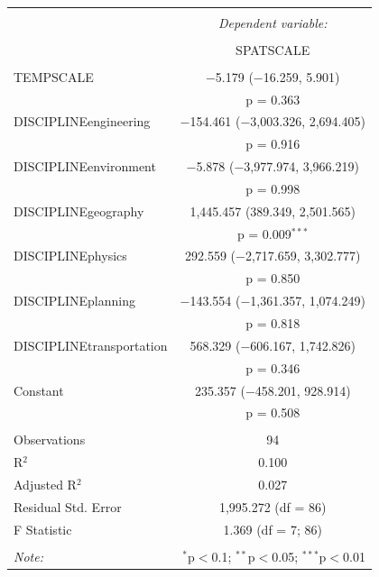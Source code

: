 \begin{table}[!htbp] \centering 
  \caption{} 
  \label{} 
\begin{tabular}{@{\extracolsep{5pt}}lc} 
\\[-1.8ex]\hline 
\hline \\[-1.8ex] 
 & \multicolumn{1}{c}{\textit{Dependent variable:}} \\ 
\cline{2-2} 
\\[-1.8ex] & SPATSCALE \\ 
\hline \\[-1.8ex] 
 TEMPSCALE & $-$5.179 ($-$16.259, 5.901) \\ 
  & p = 0.363 \\ 
  DISCIPLINEengineering & $-$154.461 ($-$3,003.326, 2,694.405) \\ 
  & p = 0.916 \\ 
  DISCIPLINEenvironment & $-$5.878 ($-$3,977.974, 3,966.219) \\ 
  & p = 0.998 \\ 
  DISCIPLINEgeography & 1,445.457 (389.349, 2,501.565) \\ 
  & p = 0.009$^{***}$ \\ 
  DISCIPLINEphysics & 292.559 ($-$2,717.659, 3,302.777) \\ 
  & p = 0.850 \\ 
  DISCIPLINEplanning & $-$143.554 ($-$1,361.357, 1,074.249) \\ 
  & p = 0.818 \\ 
  DISCIPLINEtransportation & 568.329 ($-$606.167, 1,742.826) \\ 
  & p = 0.346 \\ 
  Constant & 235.357 ($-$458.201, 928.914) \\ 
  & p = 0.508 \\ 
 \hline \\[-1.8ex] 
Observations & 94 \\ 
R$^{2}$ & 0.100 \\ 
Adjusted R$^{2}$ & 0.027 \\ 
Residual Std. Error & 1,995.272 (df = 86) \\ 
F Statistic & 1.369 (df = 7; 86) \\ 
\hline 
\hline \\[-1.8ex] 
\textit{Note:}  & \multicolumn{1}{r}{$^{*}$p$<$0.1; $^{**}$p$<$0.05; $^{***}$p$<$0.01} \\ 
\end{tabular} 
\end{table} 



